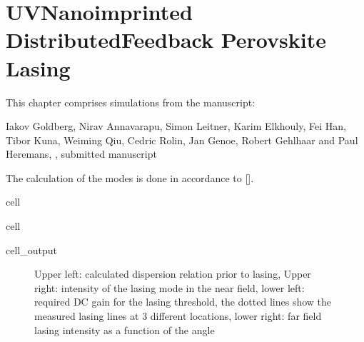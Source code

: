 \documentclass[a4paper,10pt,english,openany,oneside]{jupyterBook}
\begin{document}
\chapter{UV\sphinxhyphen{}Nanoimprinted Distributed\sphinxhyphen{}Feedback Perovskite Lasing}
\label{\detokenize{NanoimprintedDFB:uv-nanoimprinted-distributed-feedback-perovskite-lasing}}\label{\detokenize{NanoimprintedDFB::doc}}
\sphinxAtStartPar
This chapter comprises simulations from the manuscript:

\sphinxAtStartPar
Iakov Goldberg, Nirav Annavarapu, Simon Leitner, Karim Elkhouly, Fei Han, Tibor Kuna, Weiming Qiu, Cedric Rolin, Jan Genoe, Robert Gehlhaar and Paul Heremans, , submitted manuscript

\sphinxAtStartPar
The calculation of the modes is done in accordance to {[}{]}.

\begin{sphinxuseclass}{cell}
\end{sphinxuseclass}
\begin{sphinxuseclass}{cell}\begin{sphinxVerbatimOutput}

\begin{sphinxuseclass}{cell_output}
\begin{figure}[htbp]
\centering
\capstart

\noindent{}
\caption{Upper left: calculated dispersion relation prior to lasing, Upper right: intensity of the lasing mode in the near field, lower left: required DC gain for the lasing threshold, the dotted lines show the measured lasing lines at 3 different locations, lower right: far field lasing intensity as a function of the angle}\label{\detokenize{NanoimprintedDFB:iakov1}}\end{figure}

\end{sphinxuseclass}\end{sphinxVerbatimOutput}

\end{sphinxuseclass}






\renewcommand{\indexname}{Index}
\printindex
\end{document}
